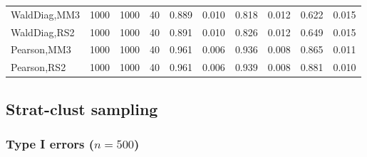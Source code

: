 \documentclass[
]{article}
\begin{document}
\begin{table}[H]
{\begin{tabular}[t]{lrrrrrrlrr}
\hspace{1em}WaldDiag,MM3 & 1000 & 1000 & 40 & 0.889 & 0.010 & 0.818 & 0.012 & 0.622 & 0.015\\
\hspace{1em}WaldDiag,RS2 & 1000 & 1000 & 40 & 0.891 & 0.010 & 0.826 & 0.012 & 0.649 & 0.015\\
\hspace{1em}Pearson,MM3 & 1000 & 1000 & 40 & 0.961 & 0.006 & 0.936 & 0.008 & 0.865 & 0.011\\
\hspace{1em}Pearson,RS2 & 1000 & 1000 & 40 & 0.961 & 0.006 & 0.939 & 0.008 & 0.881 & 0.010\\
\bottomrule
\end{tabular}}
\endgroup{}
\end{table}

\hypertarget{strat-clust-sampling}{%
\subsection{Strat-clust sampling}\label{strat-clust-sampling}}

\hypertarget{type-i-errors-n500-3}{%
\subsubsection{\texorpdfstring{Type I errors
(\(n=500\))}{Type I errors (n=500)}}\label{type-i-errors-n500-3}}
\end{document}
